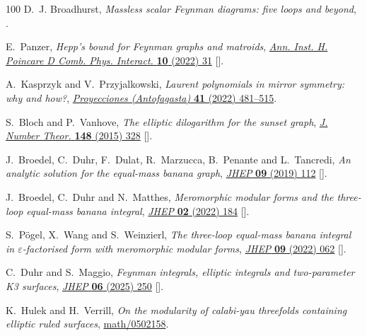 \documentclass[12pt,a4paper]{article}
\theoremstyle{plain}
\theoremstyle{remark}
\begin{document}
\begin{thebibliography}{100}
D.~J. Broadhurst, \emph{{Massless scalar Feynman diagrams: five loops and
  beyond}},  \href{https://arxiv.org/abs/1604.08027}{{}}.

E.~Panzer, \emph{{Hepp\textquoteright{}s bound for Feynman graphs and
  matroids}}, \href{https://doi.org/10.4171/aihpd/126}{\emph{Ann. Inst. H.
  Poincare D Comb. Phys. Interact.} {\bfseries 10} (2022) 31}
  [\href{https://arxiv.org/abs/1908.09820}{{}}].

A.~Kasprzyk and V.~Przyjalkowski, \emph{Laurent polynomials in mirror symmetry:
  why and how?},
  \href{https://doi.org/10.22199/issn.0717-6279-5279}{\emph{Proyecciones
  (Antofagasta)} {\bfseries 41} (2022) 481–515}.

S.~Bloch and P.~Vanhove, \emph{{The elliptic dilogarithm for the sunset
  graph}}, \href{https://doi.org/10.1016/j.jnt.2014.09.032}{\emph{J. Number
  Theor.} {\bfseries 148} (2015) 328}
  [\href{https://arxiv.org/abs/1309.5865}{{}}].

J.~Broedel, C.~Duhr, F.~Dulat, R.~Marzucca, B.~Penante and L.~Tancredi,
  \emph{{An analytic solution for the equal-mass banana graph}},
  \href{https://doi.org/10.1007/JHEP09(2019)112}{\emph{JHEP} {\bfseries 09}
  (2019) 112} [\href{https://arxiv.org/abs/1907.03787}{{}}].

J.~Broedel, C.~Duhr and N.~Matthes, \emph{{Meromorphic modular forms and the
  three-loop equal-mass banana integral}},
  \href{https://doi.org/10.1007/JHEP02(2022)184}{\emph{JHEP} {\bfseries 02}
  (2022) 184} [\href{https://arxiv.org/abs/2109.15251}{{}}].

S.~P{\"o}gel, X.~Wang and S.~Weinzierl, \emph{{The three-loop equal-mass banana
  integral in {\ensuremath{\varepsilon}}-factorised form with meromorphic
  modular forms}}, \href{https://doi.org/10.1007/JHEP09(2022)062}{\emph{JHEP}
  {\bfseries 09} (2022) 062}
  [\href{https://arxiv.org/abs/2207.12893}{{}}].

C.~Duhr and S.~Maggio, \emph{{Feynman integrals, elliptic integrals and
  two-parameter K3 surfaces}},
  \href{https://doi.org/10.1007/JHEP06(2025)250}{\emph{JHEP} {\bfseries 06}
  (2025) 250} [\href{https://arxiv.org/abs/2502.15326}{{}}].

K.~Hulek and H.~Verrill, \emph{On the modularity of calabi-yau threefolds
  containing elliptic ruled surfaces},
  \href{https://arxiv.org/abs/math/0502158}{{\ttfamily math/0502158}}.


\end{thebibliography}
\end{document}
